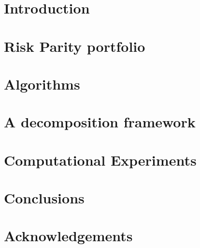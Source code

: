 \documentclass[11pt, titlepage, oneside]{book}
\numberwithin{equation}{section}
\begin{document}
\begin{titlepage}

\end{titlepage} 

\tableofcontents\clearpage
{} 
\chapter{Introduction}


\chapter{Risk Parity portfolio}


\chapter{Algorithms}


\chapter{A decomposition framework}


\chapter{Computational Experiments}


\chapter{Conclusions}


\chapter{Acknowledgements}
\clearpage

\begin{thebibliography}{9}

\end{thebibliography}
\end{document}
